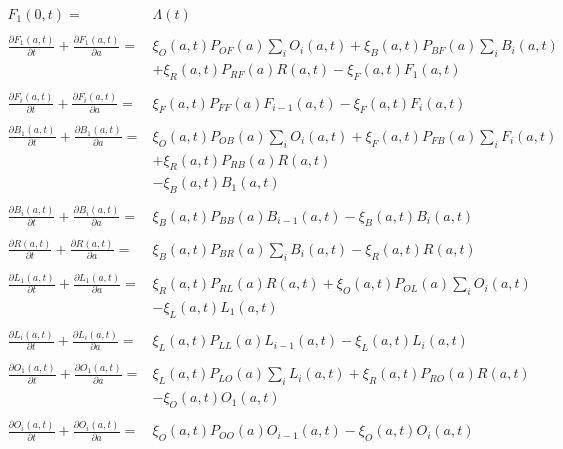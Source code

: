 \documentclass{article}
\begin{document}
\begin{equation}\begin{array}{rl}
F_1(0,t)=& \Lambda(t) \\ &\\
%
\frac{\partial F_1(a,t)}{\partial t} + \frac{\partial F_1(a,t)}{\partial a} =& 
\xi_O(a,t) P_{OF}(a) \sum_i O_i(a,t) 
+ \xi_B(a,t) P_{BF}(a)  \sum_i B_i(a,t) \\&
+ \xi_R(a,t) P_{RF}(a) R(a,t) 
- \xi_F(a,t) F_1(a,t) \\ &\\
%
\frac{\partial F_i(a,t)}{\partial t} + \frac{\partial F_i(a,t)}{\partial a} =& \xi_F(a,t) P_{FF}(a) F_{i-1} (a,t) - \xi_F(a,t) F_i(a,t) \\ &\\
%
%
\frac{\partial B_1(a,t)}{\partial t} + \frac{\partial B_1(a,t)}{\partial a} =&  
\xi_O(a,t) P_{OB}(a) \sum_i O_i(a,t) 
+ \xi_F(a,t) P_{FB}(a) \sum_i F_i(a,t)\\& 
+ \xi_R(a,t) P_{RB}(a) R(a,t)
\\&
- \xi_B(a,t) B_1(a,t) \\ &\\
%
\frac{\partial B_i(a,t)}{\partial t} + \frac{\partial B_i(a,t)}{\partial a} =& \xi_B(a,t) P_{BB}(a) B_{i-1}(a,t) -
\xi_B(a,t) B_i(a,t) 
\\&\\
%
\frac{\partial R(a,t)}{\partial t} + \frac{\partial R(a,t)}{\partial a} =&  \xi_B(a,t) P_{BR}(a) \sum_i B_i(a,t) - \xi_R(a,t) R(a,t)\\ &\\
%
\frac{\partial L_1(a,t)}{\partial t} + \frac{\partial L_1(a,t)}{\partial a} =& \xi_R(a,t) P_{RL}(a) R(a,t) + 
\xi_O(a,t) P_{OL}(a) \sum_i O_i(a,t)\\& - \xi_L(a,t) L_1(a,t)
\\ &\\
%
\frac{\partial L_i(a,t)}{\partial t} + \frac{\partial L_i(a,t)}{\partial a} =& \xi_L(a,t) P_{LL}(a) L_{i-1} (a,t) - \xi_L(a,t) L_i(a,t)
\\ &\\
%
\frac{\partial O_1(a,t)}{\partial t} + \frac{\partial O_1(a,t)}{\partial a} =& \xi_L(a,t) P_{LO}(a) \sum_i L_i(a,t) 
+ \xi_R(a,t) P_{RO}(a) R(a,t) \\&
- \xi_O(a,t) O_1(a,t)
\\ &\\
%
\frac{\partial O_i(a,t)}{\partial t} + \frac{\partial O_i(a,t)}{\partial a} =& \xi_O(a,t) P_{OO}(a) O_{i-1} (a,t)   - \xi_O(a,t) O_i(a,t)
\\ 
%
\end{array}\end{equation}
\end{document}
